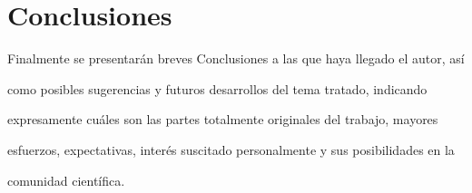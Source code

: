 \newpage\mbox{}\thispagestyle{empty}

\chapter{Conclusiones}


Finalmente se presentarán breves Conclusiones a las que haya llegado el autor, así 

como posibles sugerencias y futuros desarrollos del tema tratado, indicando 

expresamente cuáles son las partes totalmente originales del trabajo, mayores 

esfuerzos, expectativas, interés suscitado personalmente y sus posibilidades en la 

comunidad científica.